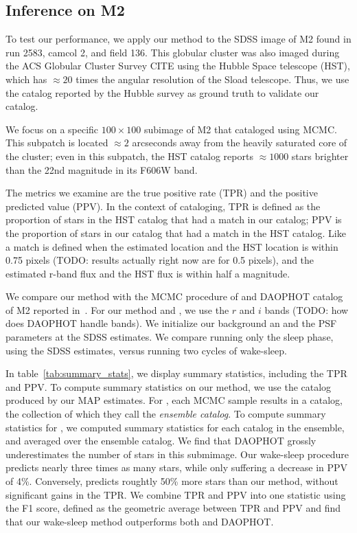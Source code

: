 \subsection{Inference on M2}
To test our performance, we apply our method to the SDSS image of M2 found in run 2583, camcol 2, and field 136. This globular cluster was also imaged during the ACS Globular Cluster Survey CITE using the Hubble Space telescope (HST), which has $\approx20$ times the angular resolution of the Sload telescope. Thus, we use the catalog reported by the Hubble survey as ground truth to validate our catalog. 

We focus on a specific $100 \times 100$ subimage of M2 that \cite{Portillo_2017, Feder_2019} cataloged using MCMC. This subpatch is located $\approx2$ arcseconds away from the heavily saturated core of the cluster; even in this subpatch, the HST catalog reports $\approx 1000$ stars brighter than the 22nd magnitude in its F606W band. 

The metrics we examine are the true positive rate (TPR) and the positive predicted value (PPV). 
In the context of cataloging, TPR is defined as the proportion of stars in the HST catalog that had a match in our catalog; PPV is the proportion of stars in our catalog that had a match in the HST catalog. 
Like \cite{Portillo_2017, Feder_2019} a match is defined when the estimated location and the HST location is within 0.75 pixels (TODO: results actually right now are for 0.5 pixels), and the estimated r-band flux and the HST flux is within half a magnitude. 

We compare our method with the MCMC procedure of \cite{Feder_2019} and DAOPHOT catalog of M2 reported in~\cite{An_2008_m2}. 
For our method and \cite{Feder_2019}, we use the $r$ and $i$ bands (TODO: how does DAOPHOT handle bands).
We initialize our background an and the PSF parameters at the SDSS estimates. We compare running only the sleep phase, using the SDSS estimates, versus running two cycles of wake-sleep. 

In table~\ref{tab:summary_stats}, we display summary statistics, including the TPR and PPV. To compute summary statistics on our method, we use the catalog produced by our MAP estimates. For \cite{Feder_2019}, each MCMC sample results in a catalog, the collection of which they call the {\itshape ensemble catalog}. To compute summary statistics for \cite{Feder_2019}, we computed summary statistics for each catalog in the ensemble, and averaged over the ensemble catalog. We find that DAOPHOT grossly underestimates the number of stars in this submimage. Our wake-sleep procedure predicts nearly three times as many stars, while only suffering a decrease in PPV of 4\%. Conversely, \cite{Feder_2019} predicts roughtly 50\% more stars than our method, without significant gains in the TPR. We combine TPR and PPV into one statistic using the F1 score, defined as the geometric average between TPR and PPV and find that our wake-sleep method outperforms both \cite{Feder_2019} and DAOPHOT. 

